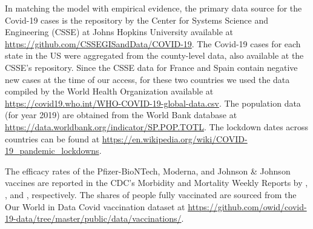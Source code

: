 \documentclass[12pt]{article}
\begin{document}
In matching the model with empirical evidence, the primary data source for the
Covid-19 cases is the repository by the Center for Systems Science and
Engineering (CSSE) at Johns Hopkins University available at
\url{https://github.com/CSSEGISandData/COVID-19}. The Covid-19 cases for each
state in the US were aggregated from the county-level data, also available at
the CSSE's repository. Since the CSSE data for France and Spain contain
negative new cases at the time of our access, for these two countries we used
the data compiled by the World Health Organization available at
\url{https://covid19.who.int/WHO-COVID-19-global-data.csv}. The population
data (for year 2019) are obtained from the World Bank database at
\url{https://data.worldbank.org/indicator/SP.POP.TOTL}. The lockdown dates
across countries can be found at \url{https://en.wikipedia.org/wiki/COVID-19_pandemic_lockdowns}.

The efficacy rates of the Pfizer-BioNTech, Moderna, and Johnson \& Johnson
vaccines are reported in the CDC's Morbidity and Mortality Weekly Reports by
\cite{Pfizer2020efficacy}, \cite{Moderna2021efficacy}, and
\cite{Janssen2021efficacy}, respectively. The shares of people fully
vaccinated are sourced from the Our World in Data Covid vaccination dataset at \url{https://github.com/owid/covid-19-data/tree/master/public/data/vaccinations/}.%

\FloatBarrier
%

\begin{singlespace}%
%

\footnotesize


%

\end{singlespace}%
\pagebreak
\end{document}
